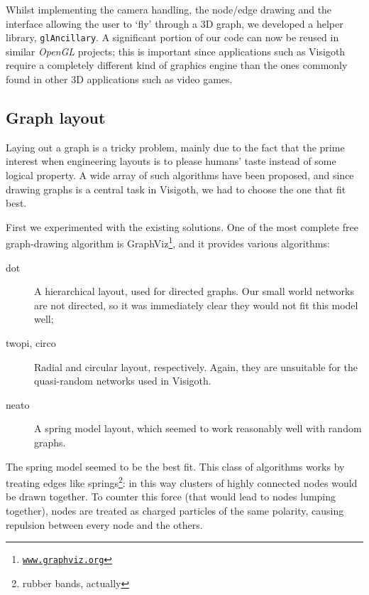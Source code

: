 \documentclass[a4paper,11pt,titlepage]{article}
\let\stdhref\href
\renewcommand{\href}[2]{\stdhref{#1}{\texttt{#2}}}
\newcommand{\code}[1]{\texttt{#1}}
\newcommand{\buzz}[1]{\emph{#1}}
\newcommand{\OpenGL}{\buzz{OpenGL} }
\begin{document}
Whilst implementing the camera handling, the node/edge drawing and the
interface allowing the user to `fly' through a 3D graph, we developed
a helper library, \code{glAncillary}. A significant portion of our
code can now be reused in similar \OpenGL projects; this is important
since applications such as Visigoth require a completely different
kind of graphics engine than the ones commonly found in other 3D
applications such as video games.



\subsection{Graph layout}

Laying out a graph is a tricky problem, mainly due to the fact that
the prime interest when engineering layouts is to please humans' taste
instead of some logical property. A wide array of such algorithms have
been proposed, and since drawing graphs is a central task in Visigoth,
we had to choose the one that fit best.

First we experimented with the existing solutions. One of the most
complete free graph-drawing algorithm is
GraphViz\footnote{\href{http://www.graphviz.org/}{www.graphviz.org}},
and it provides various algorithms:

\begin{description}
\item [dot] A hierarchical layout, used for directed graphs. Our small
  world networks are not directed, so it was immediately clear they
  would not fit this model well;

\item [twopi, circo] Radial and circular layout, respectively. Again,
  they are unsuitable for the quasi-random networks used in Visigoth.

\item [neato] A spring model layout, which seemed to work reasonably
  well with random graphs.
\end{description}

The spring model seemed to be the best fit. This class of algorithms
works by treating edges like springs\footnote{rubber bands, actually}:
in this way clusters of highly connected nodes would be drawn
together. To counter this force (that would lead to nodes lumping
together), nodes are treated as charged particles of the same
polarity, causing repulsion between every node and the others.
\end{document}
